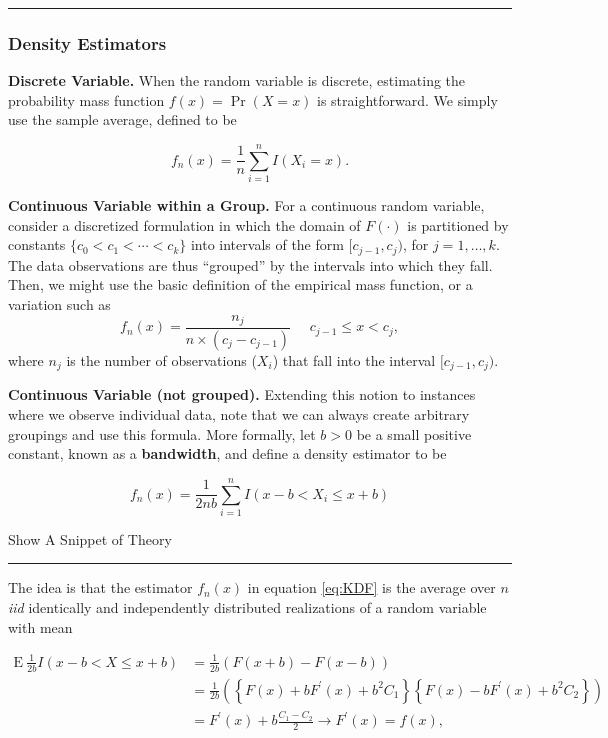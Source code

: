 \documentclass[]{book}
\theoremstyle{definition}
\theoremstyle{definition}
\theoremstyle{definition}
\theoremstyle{remark}
\begin{document}
\begin{center}\rule{0.5\linewidth}{\linethickness}\end{center}

\subsubsection{Density Estimators}\label{density-estimators}

\textbf{Discrete Variable.} When the random variable is discrete,
estimating the probability mass function \(f(x) = \Pr(X=x)\) is
straightforward. We simply use the sample average, defined to be

\[f_n(x) = \frac{1}{n} \sum_{i=1}^n I(X_i = x).\]

\textbf{Continuous Variable within a Group.} For a continuous random
variable, consider a discretized formulation in which the domain of
\(F(\cdot)\) is partitioned by constants
\(\{c_0 < c_1 < \cdots < c_k\}\) into intervals of the form
\([c_{j-1}, c_j)\), for \(j=1, \ldots, k\). The data observations are
thus ``grouped'' by the intervals into which they fall. Then, we might
use the basic definition of the empirical mass function, or a variation
such as
\[f_n(x) = \frac{n_j}{n \times (c_j - c_{j-1})}  \ \ \ \ \ \ c_{j-1} \le x < c_j,\]
where \(n_j\) is the number of observations (\(X_i\)) that fall into the
interval \([c_{j-1}, c_j)\).

\textbf{Continuous Variable (not grouped).} Extending this notion to
instances where we observe individual data, note that we can always
create arbitrary groupings and use this formula. More formally, let
\(b>0\) be a small positive constant, known as a \textbf{bandwidth}, and
define a density estimator to be

\begin{equation}
  f_n(x) = \frac{1}{2nb} \sum_{i=1}^n I(x-b < X_i \le x + b)
  \label{eq:KDF}
\end{equation}

Show A Snippet of Theory

\hypertarget{Theorykerneldensity}{}
\begin{center}\rule{0.5\linewidth}{\linethickness}\end{center}

The idea is that the estimator \(f_n(x)\) in equation \eqref{eq:KDF} is
the average over \(n\) \emph{iid}{ identically and independently
distributed} realizations of a random variable with mean

\[
\begin{aligned}
\mathrm{E~ } \frac{1}{2b} I(x-b < X \le x + b) &=  \frac{1}{2b}\left(F(x+b)-F(x-b)\right) \\
&=  \frac{1}{2b} \left( \left\{ F(x) + b F^{\prime}(x) + b^2 C_1\right\}
\left\{ F(x) - b F^{\prime}(x) + b^2 C_2\right\} \right) \\
&=  F^{\prime}(x) + b \frac{C_1-C_2}{2} \rightarrow  F^{\prime}(x) = f(x),
\end{aligned}
\]
\end{document}
